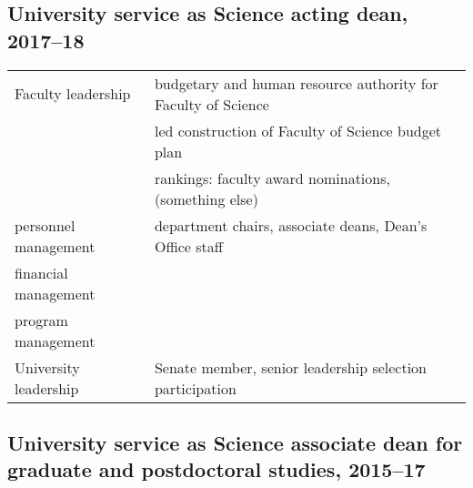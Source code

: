 \subsection{University service as Science acting dean, 2017--18}

\begin{tabularx}{\textwidth}{lX}
Faculty leadership & budgetary and human resource authority for Faculty of Science \\
& led construction of Faculty of Science budget plan  \\
& rankings: faculty award nominations, (something else) \\
personnel management & department chairs, associate deans, Dean's Office staff  \\
financial management & \\
program management & \\
University leadership  &  Senate member,  senior leadership selection participation\\
\end{tabularx}


\subsection{University service as Science associate dean for graduate and postdoctoral studies, 2015--17}


